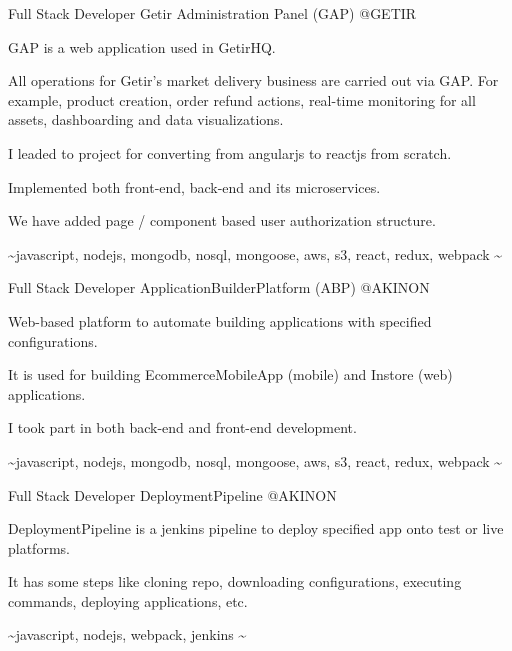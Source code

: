 \begin{cventries}
  \cventry
    {Full Stack Developer} %
    {Getir Administration Panel (GAP)} %
    {@GETIR} %
    {}
    {
      \begin{cvitems} %
        \item {GAP is a web application used in GetirHQ.}
        \item {All operations for Getir's market delivery business are carried out via GAP. For example, product creation, order refund actions, real-time monitoring for all assets, dashboarding and data visualizations.}
        \item {I leaded to project for converting from angularjs to reactjs from scratch.}
        \item {Implemented both front-end, back-end and its microservices.}
        \item {We have added page / component based user authorization structure.}
        \item {\textasciitilde javascript, nodejs, mongodb, nosql, mongoose, aws, s3, react, redux, webpack \textasciitilde}
      \end{cvitems}
    }

  \cventry
    {Full Stack Developer} %
    {ApplicationBuilderPlatform (ABP)} %
    {@AKINON} %
    {}
    {
      \begin{cvitems} %
        \item {Web-based platform to automate building applications with specified configurations.}
        \item {It is used for building EcommerceMobileApp (mobile) and Instore (web) applications.}
        \item {I took part in both back-end and front-end development.}
        \item {\textasciitilde javascript, nodejs, mongodb, nosql, mongoose, aws, s3, react, redux, webpack \textasciitilde}
      \end{cvitems}
    }

  \cventry
    {Full Stack Developer} %
    {DeploymentPipeline} %
    {@AKINON} %
    {}
    {
      \begin{cvitems} %
        \item {DeploymentPipeline is a jenkins pipeline to deploy specified app onto test or live platforms.}
        \item {It has some steps like cloning repo, downloading configurations, executing commands, deploying applications, etc.}
        \item {\textasciitilde javascript, nodejs, webpack, jenkins \textasciitilde}
      \end{cvitems}
    }


\end{cventries}
